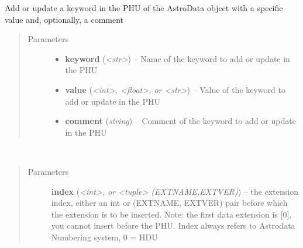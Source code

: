 \documentclass[letterpaper,10pt,english]{sphinxmanual}
\begin{document}
\begin{fulllineitems}
\begin{fulllineitems}
\begin{quote}
\begin{description}
\end{description}\end{quote}

\end{fulllineitems}


\begin{fulllineitems}
\label{astro_class:astrodata.AstroData.phu_set_key_value}
Add or update a keyword in the PHU of the AstroData object with a
specific value and, optionally, a comment
\begin{quote}\begin{description}
\item[{Parameters}] \leavevmode\begin{itemize}
\item {} 
\textbf{keyword} (\emph{\textless{}str\textgreater{}}) -- Name of the keyword to add or update in the PHU

\item {} 
\textbf{value} (\emph{\textless{}int\textgreater{}, \textless{}float\textgreater{}, or \textless{}str\textgreater{}}) -- Value of the keyword to add or update in the PHU

\item {} 
\textbf{comment} (\emph{string}) -- Comment of the keyword to add or update in the PHU

\end{itemize}

\end{description}\end{quote}

\end{fulllineitems}


\begin{fulllineitems}
\label{astro_class:astrodata.AstroData.remove}~\begin{quote}\begin{description}
\item[{Parameters}] \leavevmode
\textbf{index} (\emph{\textless{}int\textgreater{}, or \textless{}tuple\textgreater{} (EXTNAME,EXTVER)}) -- the extension index, either an int or (EXTNAME, EXTVER)
pair before which the extension is to be inserted.
Note: the first data extension is {[}0{]}, you cannot insert 
before the PHU. Index always refers to Astrodata Numbering 
system, 0 = HDU


\end{description}
\end{quote}
\end{fulllineitems}
\end{fulllineitems}
\end{document}
